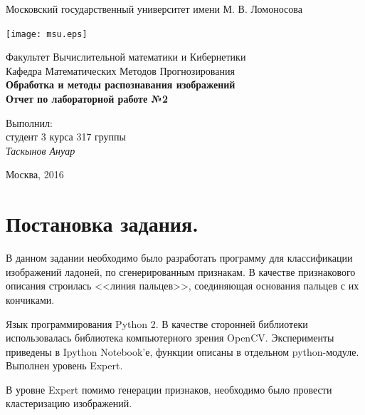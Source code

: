 \documentclass[12pt,fleqn]{article}
\begin{document}
\begin{titlepage}
\begin{center}
    Московский государственный университет имени М. В. Ломоносова

    \bigskip
    \texttt{[image: msu.eps]}

    \bigskip
    Факультет Вычислительной математики и Кибернетики\\
  	Кафедра Математических Методов Прогнозирования\\[10mm]

	\textsf{\large\bfseries
        Обработка и методы распознавания изображений
    }\\[10mm]
    \textsf{\large\bfseries
        Отчет по лабораторной работе №2
    }\\[10mm]
	
	\bigskip
	\bigskip
	\bigskip
	\bigskip
	\bigskip
	\bigskip
	\bigskip
	\bigskip
	\bigskip
	
    \begin{flushright}
        \parbox{0.5\textwidth}{
            Выполнил:\\
            студент 3 курса 317 группы\\
            \emph{Таскынов Ануар}\\[5mm]
        }
    \end{flushright}

    \vspace{\fill}
    Москва, 2016
\end{center}
\end{titlepage}

\newpage
\renewcommand{\contentsname}{Содержание.}
\tableofcontents
\newpage
\section{Постановка задания.}

В данном задании необходимо было разработать программу для классификации изображений ладоней, по сгенерированным признакам. В качестве признакового описания строилась <<линия пальцев>>, соединяющая основания пальцев с их кончиками. 

Язык программирования Python 2. В качестве сторонней библиотеки использовалась библиотека компьютерного зрения OpenCV.  Эксперименты приведены в Ipython Notebook'е, функции описаны в отдельном python-модуле. Выполнен уровень Expert.

В уровне Expert помимо генерации признаков, необходимо было провести кластеризацию изображений.
\end{document}
